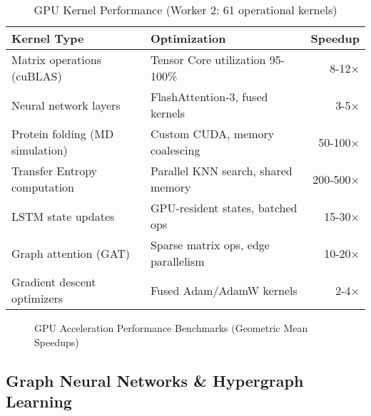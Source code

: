 \documentclass[11pt,letterpaper]{article}
\begin{document}
\begin{table}[H]
\centering
\begin{tabularx}{\textwidth}{Xlr}
\toprule
\textbf{Kernel Type} & \textbf{Optimization} & \textbf{Speedup} \\
\midrule
Matrix operations (cuBLAS) & Tensor Core utilization 95-100\% & 8-12× \\
Neural network layers & FlashAttention-3, fused kernels & 3-5× \\
Protein folding (MD simulation) & Custom CUDA, memory coalescing & 50-100× \\
Transfer Entropy computation & Parallel KNN search, shared memory & 200-500× \\
LSTM state updates & GPU-resident states, batched ops & 15-30× \\
Graph attention (GAT) & Sparse matrix ops, edge parallelism & 10-20× \\
Gradient descent optimizers & Fused Adam/AdamW kernels & 2-4× \\
\bottomrule
\end{tabularx}
\caption{GPU Kernel Performance (Worker 2: 61 operational kernels)}
\end{table}

\begin{figure}[H]
\centering
{}
\caption{GPU Acceleration Performance Benchmarks (Geometric Mean Speedups)}
\end{figure}

\subsection{Graph Neural Networks \& Hypergraph Learning}
\end{document}
